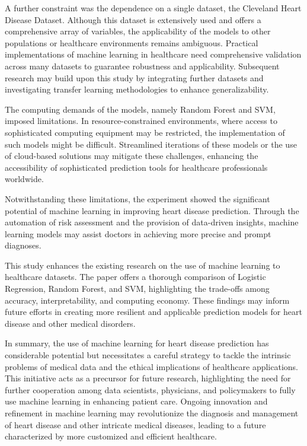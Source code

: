 A further constraint was the dependence on a single dataset, the Cleveland Heart Disease Dataset. Although this dataset is extensively used and offers a comprehensive array of variables, the applicability of the models to other populations or healthcare environments remains ambiguous. Practical implementations of machine learning in healthcare need comprehensive validation across many datasets to guarantee robustness and applicability. Subsequent research may build upon this study by integrating further datasets and investigating transfer learning methodologies to enhance generalizability.

The computing demands of the models, namely Random Forest and SVM, imposed limitations. In resource-constrained environments, where access to sophisticated computing equipment may be restricted, the implementation of such models might be difficult. Streamlined iterations of these models or the use of cloud-based solutions may mitigate these challenges, enhancing the accessibility of sophisticated prediction tools for healthcare professionals worldwide.

Notwithstanding these limitations, the experiment showed the significant potential of machine learning in improving heart disease prediction. Through the automation of risk assessment and the provision of data-driven insights, machine learning models may assist doctors in achieving more precise and prompt diagnoses. 

This study enhances the existing research on the use of machine learning to healthcare datasets. The paper offers a thorough comparison of Logistic Regression, Random Forest, and SVM, highlighting the trade-offs among accuracy, interpretability, and computing economy. These findings may inform future efforts in creating more resilient and applicable prediction models for heart disease and other medical disorders.

In summary, the use of machine learning for heart disease prediction has considerable potential but necessitates a careful strategy to tackle the intrinsic problems of medical data and the ethical implications of healthcare applications. This initiative acts as a precursor for future research, highlighting the need for further cooperation among data scientists, physicians, and policymakers to fully use machine learning in enhancing patient care. Ongoing innovation and refinement in machine learning may revolutionize the diagnosis and management of heart disease and other intricate medical diseases, leading to a future characterized by more customized and efficient healthcare.
